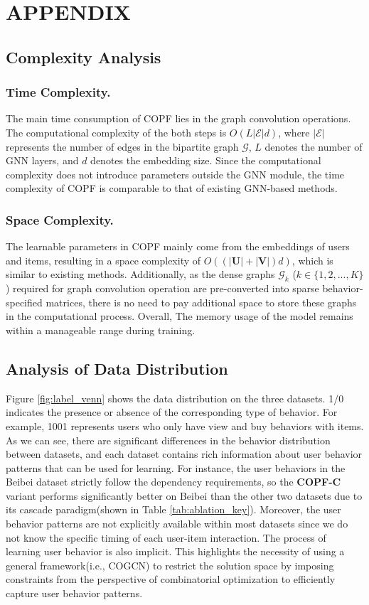 \section{APPENDIX}
\subsection{Complexity Analysis}
\label{complexity}
\subsubsection{Time Complexity.}
The main time consumption of COPF lies in the graph convolution operations. The computational complexity of the both steps is $O\left(L\left|\mathcal{E} \right| d\right)$, where $\left|\mathcal{E} \right|$ represents the number of edges in the bipartite graph $\mathcal{G}$, $L$ denotes the number of GNN layers, and $d$ denotes the embedding size. Since the computational complexity does not introduce parameters outside the GNN module, the time complexity of COPF is comparable to that of existing GNN-based methods.

\subsubsection{Space Complexity.} 
The learnable parameters in COPF mainly come from the embeddings of users and items, resulting in a space complexity of $O\left((|\mathbf{U}|+|\mathbf{V}|)d\right)$, which is similar to existing methods. Additionally, as the dense graphs $\mathcal{G}_{k}$ ($k \in \{1,2,...,K\}$) required for graph convolution operation are pre-converted into sparse behavior-specified matrices, there is no need to pay additional space to store these graphs in the computational process. Overall, The memory usage of the model remains within a manageable range during training.


\subsection{Analysis of Data Distribution}


Figure \ref{fig:label_venn} shows the data distribution on the three datasets. 1/0 indicates the presence or absence of the corresponding type of behavior. For example, 1001 represents users who only have view and buy behaviors with items. As we can see, there are significant differences in the behavior distribution between datasets, and each dataset contains rich information about user behavior patterns that can be used for learning. For instance, the user behaviors in the Beibei dataset strictly follow the dependency requirements, so the \textbf{COPF-C} variant performs significantly better on Beibei than the other two datasets due to its cascade paradigm(shown in Table \ref{tab:ablation_key}). Moreover, the user behavior patterns are not explicitly available within most datasets since we do not know the specific timing of each user-item interaction. The process of learning user behavior is also implicit. This highlights the necessity of using a general framework(i.e., COGCN) to restrict the solution space by imposing constraints from the perspective of combinatorial optimization to efficiently capture user behavior patterns.

